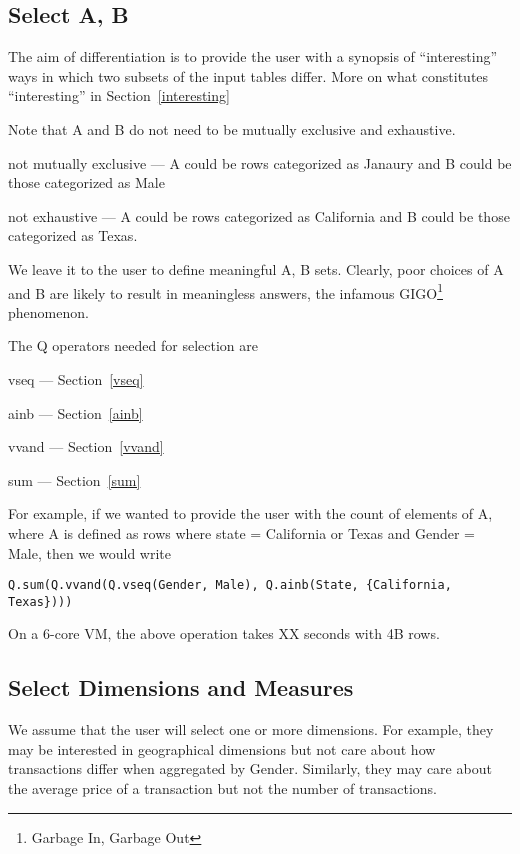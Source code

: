 \subsection{Select A, B}
\label{SelectAB}

The aim of differentiation is to provide the user with a synopsis of
``interesting'' ways in which two subsets of the input tables differ. 
More on what constitutes ``interesting'' in Section~\ref{interesting}

Note that A and B do not need to be mutually exclusive and exhaustive. 
\bi
\item not mutually exclusive --- 
A could be rows categorized as Janaury and B could be those
categorized as Male
\item not exhaustive  ---
A could be rows categorized as California and B could be those
categorized as Texas. 
\ei

We leave it to the user to define meaningful A, B sets.
Clearly, poor choices of A and B are likely to result in meaningless
answers, the infamous GIGO\footnote{Garbage In, Garbage Out} phenomenon.

The Q operators needed for selection are 
\be
\item vseq --- Section~\ref{vseq}
\item ainb --- Section~\ref{ainb}
\item vvand --- Section~\ref{vvand}
\item sum --- Section~\ref{sum}
\ee

For example, if we wanted to provide the user with the count of elements of A,
where A is defined as rows where state = California or Texas and Gender = Male,
then we would write
\begin{verbatim}
Q.sum(Q.vvand(Q.vseq(Gender, Male), Q.ainb(State, {California, Texas})))
\end{verbatim}
On a 6-core VM, the above operation takes XX seconds with 4B rows.

\subsection{Select Dimensions and Measures}
\label{DimsAndMeasures}

We assume that the user will select one or more dimensions. For example, they
may be interested in geographical dimensions but not care about how transactions
differ when aggregated by Gender. Similarly, they may care about the average
price of a transaction but not the number of transactions.

